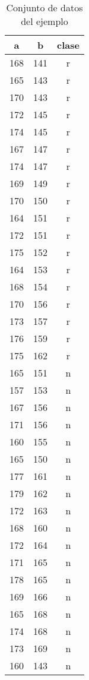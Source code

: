 \documentclass[
10pt, %
a4paper, %
]{article}
\begin{document}
	\begin{table}[H]
		\centering
		\begin{tabular}{c|c|c}
			 \textbf{a} & \textbf{b} & \textbf{clase}\\\midrule 
			 168 & 141 & r \\
			 165 & 143 & r\\
			 170 & 143 & r\\
			 172 & 145 & r\\
			 174 & 145 & r\\
			 167 & 147 & r\\
			 174 & 147 & r\\
			 169 & 149 & r\\
			 170 & 150 & r\\
			 164 & 151 & r\\
			 172 & 151 & r\\
			 175 & 152 & r\\
			 164 & 153 & r\\
			 168 & 154 & r\\
			 170 & 156 & r\\
			 173 & 157 & r\\
			 176 & 159 & r\\
			 175 & 162 & r\\
			 165 & 151 & n\\
			 157 & 153 & n\\
			 167 & 156 & n\\
			 171 & 156 & n\\
			 160 & 155 & n\\
			 165 & 150 & n\\
			 177 & 161 & n\\
			 179 & 162 & n\\
			 172 & 163 & n\\
			 168 & 160 & n\\
			 172 & 164 & n\\
			 171 & 165 & n\\
			 178 & 165 & n\\
			 169 & 166 & n\\
			 165 & 168 & n\\
			 174 & 168 & n\\
			 173 & 169 & n\\
			 160 & 143 & n\\
		\end{tabular}
		\caption{Conjunto de datos del ejemplo}
		\label{table:datosEjemplo}
	\end{table}
\end{document}

